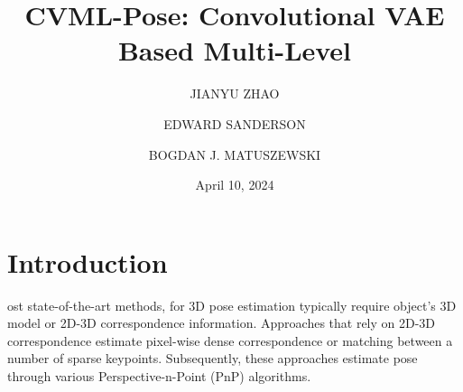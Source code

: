 \documentclass[9pt,a4paper,twoside]{tau}
\title{CVML-Pose: Convolutional VAE Based Multi-Level}
\author[a,1]{JIANYU ZHAO}
\author[b,2]{EDWARD SANDERSON}
\author[c,3]{ BOGDAN J. MATUSZEWSKI}
\affil[a]{Graduate Student Member, IEEE}
\affil[b]{Member, IEEE}
\affil[c]{Member, IEEE}
\date{April 10, 2024}
\begin{document}
	
	\maketitle
	\thispagestyle{firststyle}
	\tableofcontents
        \tableofcontents

\section{Introduction}

    ost state-of-the-art methods, for 3D pose estimation typically require object’s 3D model or 2D-3D correspondence information. Approaches that rely on 2D-3D correspondence estimate pixel-wise dense correspondence or matching between a number of sparse keypoints. Subsequently, these approaches estimate pose through various Perspective-n-Point (PnP) algorithms.
    
\end{document}
